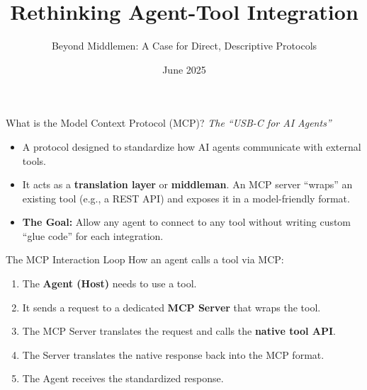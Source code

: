 \documentclass{beamer}
\title{Rethinking Agent-Tool Integration}
\subtitle{Beyond Middlemen: A Case for Direct, Descriptive Protocols}
\author{}
\date{June 2025}
\begin{document}
\begin{frame}
  \titlepage
\end{frame}

\begin{frame}{What is the Model Context Protocol (MCP)?}
  \centering\large\textit{The ``USB-C for AI Agents''}
  \vfill
  \begin{itemize}
    \item A protocol designed to standardize how AI agents communicate with external tools.
    \vfill
    \item It acts as a \textbf{translation layer} or \textbf{middleman}. An MCP server ``wraps'' an existing tool (e.g., a REST API) and exposes it in a model-friendly format.
    \vfill
    \item \textbf{The Goal:} Allow any agent to connect to any tool without writing custom ``glue code'' for each integration.
  \end{itemize}
\end{frame}

\begin{frame}{The MCP Interaction Loop}
  How an agent calls a tool via MCP:
  \begin{enumerate}
    \item<1-> The \textbf{Agent (Host)} needs to use a tool.
    \vfill
    \item<2-> It sends a request to a dedicated \textbf{MCP Server} that wraps the tool.
    \vfill
    \item<3-> The MCP Server translates the request and calls the \textbf{native tool API}.
    \vfill
    \item<4-> The Server translates the native response back into the MCP format.
    \vfill
    \item<5-> The Agent receives the standardized response.
  \end{enumerate}
\end{frame}
\end{document}

